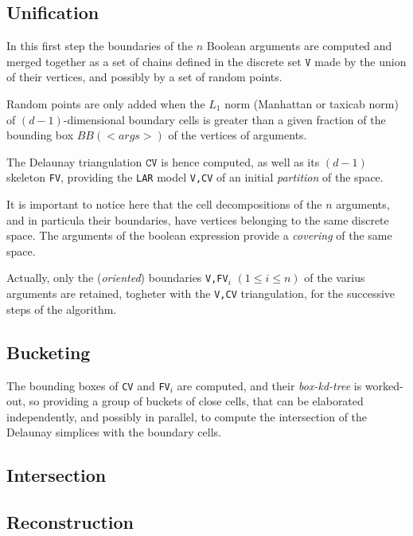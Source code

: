 \documentclass[11pt,oneside]{article}    %
\begin{document}
\subsection{Unification}

In this first step the boundaries of the $n$ Boolean arguments are computed and merged together as a set of chains defined in the discrete set $\texttt{V}$ made by the union of their vertices, and possibly by a set of random points. 

Random points are only added when the $L_1$ norm (Manhattan or taxicab norm) of $(d-1)$-dimensional boundary cells is greater than a given fraction of the bounding box $BB(<args>)$ of the vertices of arguments.

The Delaunay triangulation $\texttt{CV}$ is hence computed, as well as its $(d-1)$ skeleton \texttt{FV}, providing the  \texttt{LAR} model \texttt{V,CV} of an initial \emph{partition} of the space. 

It is important to notice here that the  cell decompositions of the $n$ arguments, and in particula their boundaries, have vertices belonging to the same discrete space. The arguments of the boolean expression provide a \emph{covering} of the same space.

Actually, only the (\emph{oriented}) boundaries \texttt{V,FV$_i$} $(1\leq i\leq n)$ of the varius arguments are retained, togheter with the \texttt{V,CV} triangulation, for the successive steps of the algorithm.

\subsection{Bucketing}

The bounding boxes of \texttt{CV} and \texttt{FV$_i$} are computed, and their \emph{box-kd-tree} is worked-out, so providing a group of buckets of close cells, that can be elaborated independently, and possibly in parallel, to compute the intersection of the Delaunay simplices with the boundary cells.  

\subsection{Intersection}

\subsection{Reconstruction}
\end{document}
